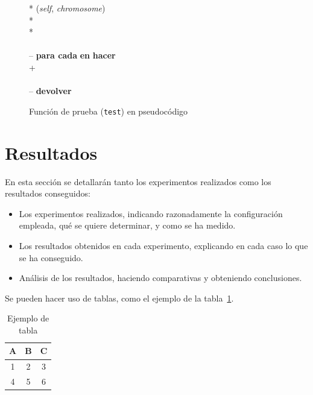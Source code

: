 \documentclass[conference,a4paper]{IEEEtran}
\begin{document}
\begin{figure}[h]
  \centering
  \begin{pseudo}*
    (\textit{self}, \textit{chromosome}) \\*
     \\*
     \\
    \textit{} \\--
    \textbf{para cada} \textit{} \textbf{en} \textit{} \textbf{hacer} \\+
        \textit{} \\
        \textit{} \\--
    \textbf{devolver} \textit{} \\
  \end{pseudo}
  \caption{Función de prueba (\texttt{test}) en pseudocódigo}
  \label{pcd:test}
\end{figure}










\section{Resultados}

En esta sección se detallarán tanto los experimentos realizados como los
resultados conseguidos:
\begin{itemize}
\item Los experimentos realizados, indicando razonadamente la configuración
  empleada, qué se quiere determinar, y como se ha medido.
\item Los resultados obtenidos en cada experimento, explicando en cada caso lo
  que se ha conseguido.
\item Análisis de los resultados, haciendo comparativas y obteniendo
  conclusiones.
\end{itemize}

Se pueden hacer uso de tablas, como el ejemplo de la tabla~\ref{tab:ejemplo}.

\begin{table}
  \caption{Ejemplo de tabla}
  \label{tab:ejemplo}
  \centering
  \begin{tabular}{ccc}
    \toprule
    A & B & C \\
    \midrule
    1 & 2 & 3 \\
    4 & 5 & 6 \\
    \bottomrule
  \end{tabular}
\end{table}
\end{document}
